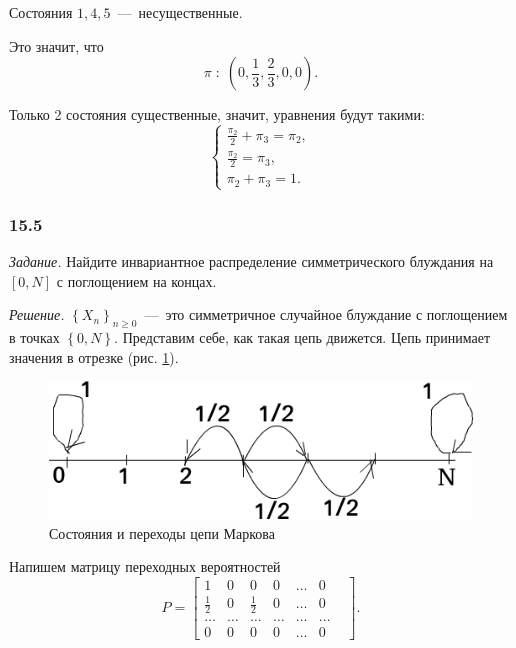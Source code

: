 \begin{enumerate}[label=\alph*)]
Состояния $1, 4, 5$~---~несущественные.

Это значит, что
\begin{equation*}
  \pi \; : \;
  \left( 0, \frac{1}{3}, \frac{2}{3}, 0, 0 \right).
\end{equation*}

Только 2 состояния существенные, значит, уравнения будут такими:
\begin{equation*}
  \begin{cases}
    \frac{ \pi_2}{2} + \pi_3 = \pi_2, \\
    \frac{ \pi_2}{2} = \pi_3, \\
    \pi_2 + \pi_3 = 1.
  \end{cases}
\end{equation*}
\end{enumerate}

\subsubsection*{15.5}

\textit{Задание.}
Найдите инвариантное распределение симметрического блуждания на $ \left[ 0, N \right] $
с поглощением на концах.

\textit{Решение.}
$ \left\{ X_n \right\}_{n \geq 0}$~---~это симметричное случайное блуждание с поглощением в точках
$ \left\{ 0, N \right\} $.
Представим себе, как такая цепь движется.
Цепь принимает значения в отрезке (рис. \ref{fig:155}).

\begin{figure}[h!]
  \centering
  \includegraphics[width=.4\textwidth]{./pictures/15_5.png}
  \caption{Состояния и переходы цепи Маркова}
  \label{fig:155}
\end{figure}

Напишем матрицу переходных вероятностей
\begin{equation*}
  P =
  \begin{bmatrix}
    1 & 0 & 0 & 0 & \dotsc & 0 \\
    \frac{1}{2} & 0 & \frac{1}{2} & 0 & \dotsc & 0 \\
    \dotsc & \dotsc & \dotsc & \dotsc & \dotsc & \dotsc & \\
    0 & 0 & 0 & 0 & \dotsc & 0
  \end{bmatrix}.
\end{equation*}

